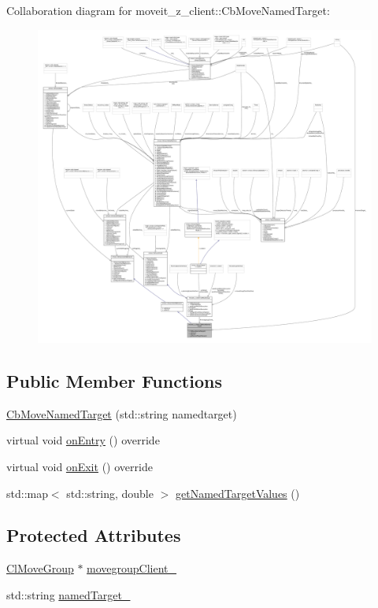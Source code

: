Collaboration diagram for moveit\+\_\+z\+\_\+client\+:\+:Cb\+Move\+Named\+Target\+:
\nopagebreak
\begin{figure}[H]
\begin{center}
\leavevmode
\includegraphics[width=350pt]{classmoveit__z__client_1_1CbMoveNamedTarget__coll__graph}
\end{center}
\end{figure}
\subsection*{Public Member Functions}
\begin{DoxyCompactItemize}
\item 
\hyperlink{classmoveit__z__client_1_1CbMoveNamedTarget_a4cd1851e18426af84f5b77724d422d4c}{Cb\+Move\+Named\+Target} (std\+::string namedtarget)
\item 
virtual void \hyperlink{classmoveit__z__client_1_1CbMoveNamedTarget_ad84bcf4ea514c0cdc3550ca41ff77d69}{on\+Entry} () override
\item 
virtual void \hyperlink{classmoveit__z__client_1_1CbMoveNamedTarget_ab91985b232e1185b4b102bb309f65ffc}{on\+Exit} () override
\item 
std\+::map$<$ std\+::string, double $>$ \hyperlink{classmoveit__z__client_1_1CbMoveNamedTarget_aa6efe35fc4ef43e8f1b4e762de70c3bf}{get\+Named\+Target\+Values} ()
\end{DoxyCompactItemize}
\subsection*{Protected Attributes}
\begin{DoxyCompactItemize}
\item 
\hyperlink{classmoveit__z__client_1_1ClMoveGroup}{Cl\+Move\+Group} $\ast$ \hyperlink{classmoveit__z__client_1_1CbMoveNamedTarget_a1caf87b542890eb9181b04dc2271ef65}{movegroup\+Client\+\_\+}
\item 
std\+::string \hyperlink{classmoveit__z__client_1_1CbMoveNamedTarget_a84a8aadc460b4a68eae22d25479c2bce}{named\+Target\+\_\+}
\end{DoxyCompactItemize}
